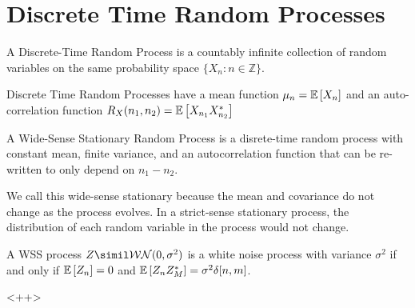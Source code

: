 \section{Discrete Time Random Processes}
\begin{definition}
	A Discrete-Time Random Process is a countably infinite collection of random variables on the same probability space $\{X_n: n\in\mathbb{Z}\}$.
	\label{defn:discrete-time-rp}
\end{definition}
Discrete Time Random Processes have a mean function $\mu_n = \mathbb{E}\left[X_n\right]$ and an auto-correlation function $R_X(n_1, n_2) = \mathbb{E}\left[X_{n_1}X_{n_2}^*\right]$
\begin{definition}
	A Wide-Sense Stationary Random Process is a disrete-time random process with constant mean, finite variance, and an autocorrelation function that can be re-written to only depend on $n_1-n_2$.
	\label{defn:wss-process}
\end{definition}
We call this wide-sense stationary because the mean and covariance do not change as the process evolves.
In a strict-sense stationary process, the distribution of each random variable in the process would not change.
\begin{definition}
	A WSS process $Z\simil \mathcal{WN}(0, \sigma^2)$ is a white noise process with variance $\sigma^2$ if and only if $\mathbb{E}\left[Z_n\right] = 0$ and $\mathbb{E}\left[Z_nZ_M^*\right] = \sigma^2\delta[n, m]$.
	\label{<+label+>}
\end{definition}<++>
